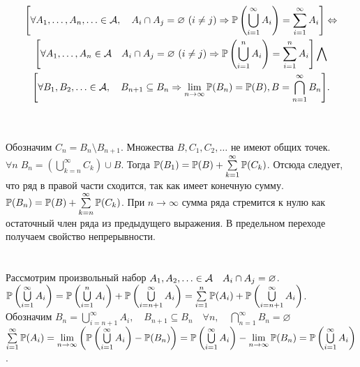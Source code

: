 \documentclass[../TV&MS.tex]{subfiles}
\begin{document}
\begin{St}
    \begin{multline*}
    \Biggl[\forall A_1, \dots, A_n, \ldots \in \mathcal{A}, \quad A_i \cap A_j  = \varnothing\  (i \neq j)
	\Rightarrow \mathbb{P}\left(\bigcup\limits_{i=1}^{\infty} A_i\right) = \sum\limits_{i = 1}^{\infty} 
    A_i\Biggr] \Leftrightarrow \\ \Biggl[ \forall A_1, \dots, A_n \in \mathcal{A} \quad A_i \cap A_j  = \varnothing\  
	(i \neq j)  \Rightarrow \mathbb{P}\left(\bigcup\limits_{i=1}^{n} A_i\right) = \sum\limits_{i = 1}^{n} 
    A_i \Biggr] \bigwedge \\ \Biggl[ \forall B_1, B_2, \ldots \in \mathcal{A}, \quad B_{n+1} \subseteq B_n 
	\Rightarrow \lim\limits_{n \to \infty} \mathbb{P}(B_n) = \mathbb{P}(B), 
	B = \displaystyle\bigcap_{n=1}^\infty B_n\Biggr].
    \end{multline*}
\end{St}
\begin{Proof}
\\ \fbox{$\Rightarrow$}\\
Обозначим $C_n = B_n \setminus B_{n+1}$. Множества $B, C_1, C_2, \ldots$ не имеют общих точек.\\
$\forall n \; B_n =  \left(\bigcup\limits_{k=n}^{\infty} C_k\right) \cup B$. Тогда $\mathbb{P}(B_1) = \mathbb{P}(B) 
+ \sum\limits_{k=1}^{\infty} \mathbb{P}(C_k)$. Отсюда следует, что ряд в правой части сходится, так как 
имеет конечную сумму. $\mathbb{P}(B_n) = \mathbb{P}(B) + \sum\limits_{k=n}^{\infty} \mathbb{P}(C_k)$. При 
$n \to \infty$ сумма ряда стремится к нулю как остаточный член ряда из предыдущего выражения.
В предельном переходе получаем свойство непрерывности.
\\\\ \fbox{$\Leftarrow$}\\
Рассмотрим произвольный набор $A_1, A_2, \ldots \in \mathcal{A} \quad A_i\cap A_j = \varnothing$.\\
$\mathbb{P}\left(\bigcup\limits_{i=1}^{\infty} A_i\right) = \mathbb{P}\left(\bigcup\limits_{i=1}^{n} A_i\right) + 
\mathbb{P}\left(\bigcup\limits_{i=n + 1}^{\infty} A_i\right) =\sum\limits_{i = 1}^{n} \mathbb{P}(A_i) +  
\mathbb{P}\left(\bigcup\limits_{i=n + 1}^{\infty} A_i\right) $.\\
Обозначим $B_n = \bigcup\limits_{i=n + 1}^{\infty} A_i,\quad B_{n+1} \subseteq B_n 
\quad \forall n,\quad \bigcap\limits_{n=1}^{\infty} B_n= \varnothing$ \\
$\sum\limits_{i=1}^{\infty} \mathbb{P}(A_i) = \lim\limits_{n \to \infty} 
\left(\mathbb{P}\left(\bigcup\limits_{i=1}^{\infty} A_i\right) - \mathbb{P}(B_n)\right) = 
\mathbb{P}\left(\bigcup\limits_{i=1}^{\infty} A_i\right) 
- \lim\limits_{n \to \infty} \mathbb{P}(B_n) = \mathbb{P}\left(\bigcup\limits_{i=1}^{\infty} A_i\right)$.
\end{Proof}
\end{document}

